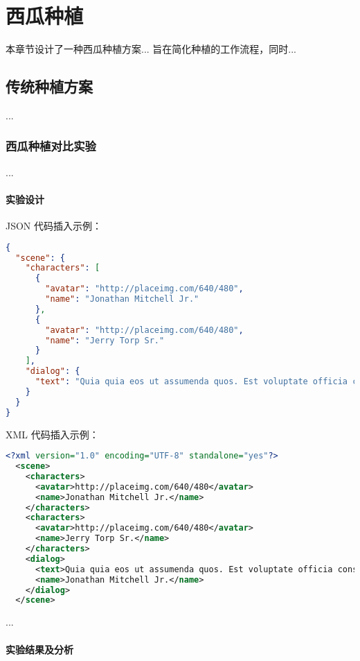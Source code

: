 
\chapter{西瓜种植}

本章节设计了一种西瓜种植方案...
旨在简化种植的工作流程，同时...

\section{传统种植方案}

...

\subsection{西瓜种植对比实验}

...

\subsubsection{实验设计}

JSON 代码插入示例：

\begin{lstlisting}[language=json]
{
  "scene": {
    "characters": [
      {
        "avatar": "http://placeimg.com/640/480",
        "name": "Jonathan Mitchell Jr."
      },
      {
        "avatar": "http://placeimg.com/640/480",
        "name": "Jerry Torp Sr."
      }
    ],
    "dialog": {
      "text": "Quia quia eos ut assumenda quos. Est voluptate officia consequatur sint assumenda natus. ..."
    }
  }
}
\end{lstlisting}

XML 代码插入示例：

\begin{lstlisting}[language=XML]
  <?xml version="1.0" encoding="UTF-8" standalone="yes"?>
  <scene>
    <characters>
      <avatar>http://placeimg.com/640/480</avatar>
      <name>Jonathan Mitchell Jr.</name>
    </characters>
    <characters>
      <avatar>http://placeimg.com/640/480</avatar>
      <name>Jerry Torp Sr.</name>
    </characters>
    <dialog>
      <text>Quia quia eos ut assumenda quos. Est voluptate officia consequatur sint assumenda natus. ...</text>
      <name>Jonathan Mitchell Jr.</name>
    </dialog>
  </scene>
\end{lstlisting}

...

\subsubsection{实验结果及分析}

